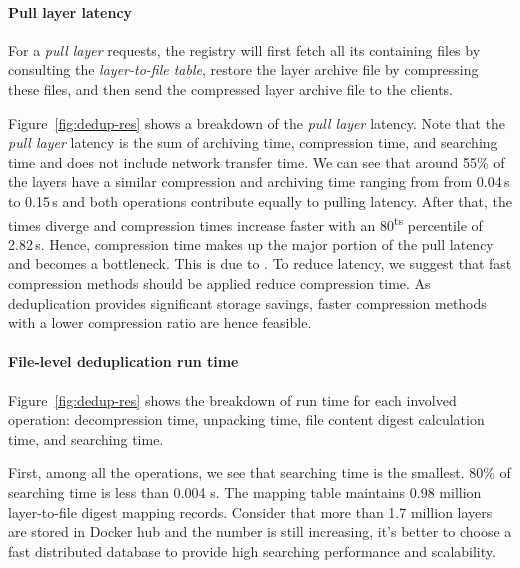 \paragraph{Pull layer latency} 

For a \emph{pull layer} requests, the registry will first fetch 
all its containing files by consulting the \textit{layer-to-file table}, 
restore the layer archive file by compressing these files, and
then send the compressed layer archive file to the clients.

Figure~\ref{fig:dedup-res} shows a breakdown of the \emph{pull layer}
latency.
%
Note that the \emph{pull layer} latency is the sum of archiving time,
compression time, and searching time and does not include network transfer
time. 
%
We can see that around 55\% of the layers have a similar compression and archiving
time ranging from from 0.04\,s to 0.15\,s and both operations contribute equally
to pulling latency.
%
%
After that, the times diverge and compression times increase faster with an
80\textsuperscript{ts} percentile of 2.82\,s. Hence, compression time makes
up the major portion of the pull latency and becomes a bottleneck.
This is due to .
%
%
To reduce latency, we suggest that fast compression methods should be applied reduce
compression time. As deduplication provides significant storage savings, faster compression
methods with a lower compression ratio are hence feasible.

%

\paragraph{File-level deduplication run time}

%
Figure~\ref{fig:dedup-res} shows the breakdown of run time for each
involved operation: decompression time, unpacking time, file content digest
calculation time, and searching time.

First, among all the operations, we see that searching time is the
smallest. 
%
80\% of searching time is less than 0.004 s. 
%
The mapping table
maintains 0.98 million layer-to-file digest mapping records. 
%
%
Consider that more
than 1.7 million layers are stored in Docker hub and the number is still
increasing, it's better to choose a fast distributed database to provide high
searching performance and scalability.
%

